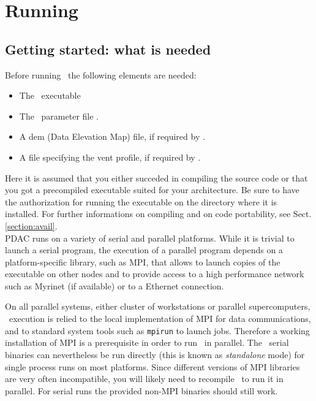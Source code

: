 \section{Running \PDAC}
\label{section:run}

\subsection{Getting started: what is needed}

Before running \PDAC\ the following elements are needed:
\begin{itemize}
\item The \PDAC\ executable 
\item The \PDAC\ parameter file .
\item A dem (Data Elevation Map) file, if required by .
\item A file specifying the vent profile, if required by .
\end{itemize}

Here it is assumed that you either succeded in compiling the source
code or that you got a precompiled executable suited for your architecture.
Be sure to have the authorization for running the executable on the
directory where it is installed. For further informations on compiling and 
on code portability, see Sect. \ref{section:avail}.\\

PDAC runs on a variety of serial and parallel platforms.  While it is
trivial to launch a serial program, the execution of a parallel program 
depends on a platform-specific library, such as MPI, that allows to launch 
copies of the executable on other nodes and to provide access to a high 
performance network such as Myrinet (if available) or to a Ethernet connection.

On all parallel systems, either cluster of workstations or parallel 
supercomputers, \PDAC\ execution is relied to the local implementation
of MPI for data communications, and to standard system tools such as
{\tt mpirun} to launch jobs. Therefore a working installation of MPI is a 
prerequisite in order to run \PDAC\ in parallel.
The \PDAC\ serial binaries can nevertheless be run directly (this is known 
as {\it standalone} mode) for single process runs on most platforms.
Since different versions of MPI libraries are very often incompatible, you will 
likely need to recompile \PDAC\ to run it in parallel. For serial runs
the provided non-MPI binaries should still work.


